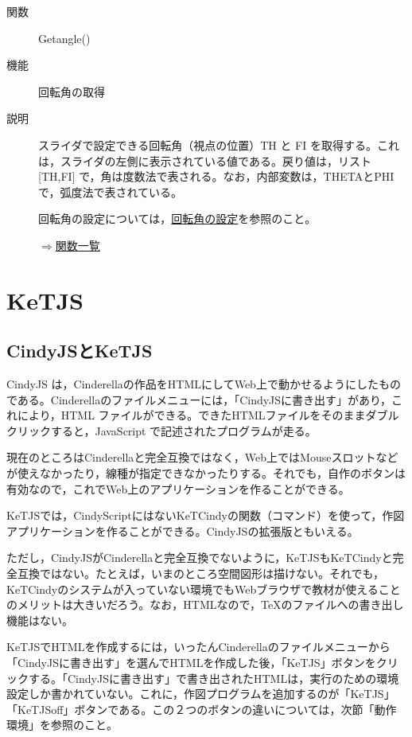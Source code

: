 \documentclass[papersize,a4paper,12pt,uplatex]{jsarticle}
\begin{document}
\begin{description}
\vspace{\baselineskip}
\hypertarget{getangle}{}
\item[関数]Getangle()
\item[機能]回転角の取得
\item[説明]スライダで設定できる回転角（視点の位置）TH と FI を取得する。これは，スライダの左側に表示されている値である。戻り値は，リスト [TH,FI] で，角は度数法で表される。なお，内部変数は，THETAとPHIで，弧度法で表されている。

回転角の設定については，\hyperlink{setangle}{回転角の設定}を参照のこと。

\begin{flushright} \hyperlink{functionlist}{$\Rightarrow$関数一覧}\end{flushright}

\end{description}

\newpage
\hypertarget{ketjs}{}
\section{KeTJS}

\subsection{CindyJSとKeTJS}

CindyJS は，Cinderellaの作品をHTMLにしてWeb上で動かせるようにしたものである。Cinderellaのファイルメニューには，「CindyJSに書き出す」があり，これにより，HTML ファイルができる。できたHTMLファイルをそのままダブルクリックすると，JavaScript で記述されたプログラムが走る。

現在のところはCinderellaと完全互換ではなく，Web上ではMouseスロットなどが使えなかったり，線種が指定できなかったりする。それでも，自作のボタンは有効なので，これでWeb上のアプリケーションを作ることができる。

KeTJSでは，CindyScriptにはないKeTCindyの関数（コマンド）を使って，作図アプリケーションを作ることができる。CindyJSの拡張版ともいえる。

ただし，CindyJSがCinderellaと完全互換でないように，KeTJSもKeTCindyと完全互換ではない。たとえば，いまのところ空間図形は描けない。それでも，KeTCindyのシステムが入っていない環境でもWebブラウザで教材が使えることのメリットは大きいだろう。なお，HTMLなので，TeXのファイルへの書き出し機能はない。

KeTJSでHTMLを作成するには，いったんCinderellaのファイルメニューから「CindyJSに書き出す」を選んでHTMLを作成した後，「KeTJS」ボタンをクリックする。「CindyJSに書き出す」で書き出されたHTMLは，実行のための環境設定しか書かれていない。これに，作図プログラムを追加するのが「KeTJS」「KeTJSoff」ボタンである。この２つのボタンの違いについては，次節「動作環境」を参照のこと。
\end{document}
